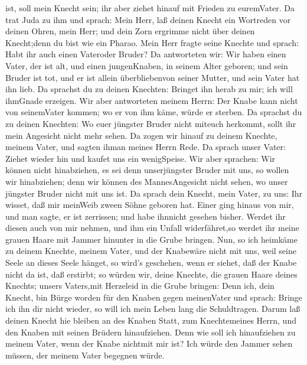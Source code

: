 ist, soll mein Knecht sein; ihr aber ziehet hinauf mit Frieden zu
euremVater.  Da trat Juda zu ihm und sprach: Mein Herr, laß
deinen Knecht ein Wortreden vor deinen Ohren, mein Herr; und dein Zorn
ergrimme nicht über deinen Knecht;denn du bist wie ein Pharao.
 Mein Herr fragte seine Knechte und sprach: Habt ihr auch
einen Vateroder Bruder?  Da antworteten wir: Wir haben
einen Vater, der ist alt, und einen jungenKnaben, in seinem Alter
geboren; und sein Bruder ist tot, und er ist allein überbliebenvon
seiner Mutter, und sein Vater hat ihn lieb.  Da sprachst du
zu deinen Knechten: Bringet ihn herab zu mir; ich will ihmGnade
erzeigen.  Wir aber antworteten meinem Herrn: Der Knabe
kann nicht von seinemVater kommen; wo er von ihm käme, würde er sterben.
 Da sprachst du zu deinen Knechten: Wo euer jüngster Bruder
nicht miteuch herkommt, sollt ihr mein Angesicht nicht mehr sehen.
 Da zogen wir hinauf zu deinem Knechte, meinem Vater, und
sagten ihman meines Herrn Rede.  Da sprach unser Vater:
Ziehet wieder hin und kaufet uns ein wenigSpeise.  Wir aber
sprachen: Wir können nicht hinabziehen, es sei denn unserjüngster Bruder
mit uns, so wollen wir hinabziehen; denn wir können des MannesAngesicht
nicht sehen, wo unser jüngster Bruder nicht mit uns ist. 
Da sprach dein Knecht, mein Vater, zu uns: Ihr wisset, daß mir meinWeib
zween Söhne geboren hat.  Einer ging hinaus von mir, und
man sagte, er ist zerrissen; und habe ihnnicht gesehen bisher.
 Werdet ihr diesen auch von mir nehmen, und ihm ein Unfall
widerfähret,so werdet ihr meine grauen Haare mit Jammer hinunter in die
Grube bringen.  Nun, so ich heimkäme zu deinem Knechte,
meinem Vater, und der Knabewäre nicht mit uns, weil seine Seele an
dieses Seele hänget,  so wird's geschehen, wenn er siehet,
daß der Knabe nicht da ist, daß erstirbt; so würden wir, deine Knechte,
die grauen Haare deines Knechts; unsers Vaters,mit Herzeleid in die
Grube bringen:  Denn ich, dein Knecht, bin Bürge worden für
den Knaben gegen meinenVater und sprach: Bringe ich ihn dir nicht
wieder, so will ich mein Leben lang die Schuldtragen. 
Darum laß deinen Knecht hie bleiben an des Knaben Statt, zum
Knechtemeines Herrn, und den Knaben mit seinen Brüdern hinaufziehen.
 Denn wie soll ich hinaufziehen zu meinem Vater, wenn der
Knabe nichtmit mir ist? Ich würde den Jammer sehen müssen, der meinem
Vater begegnen würde.


